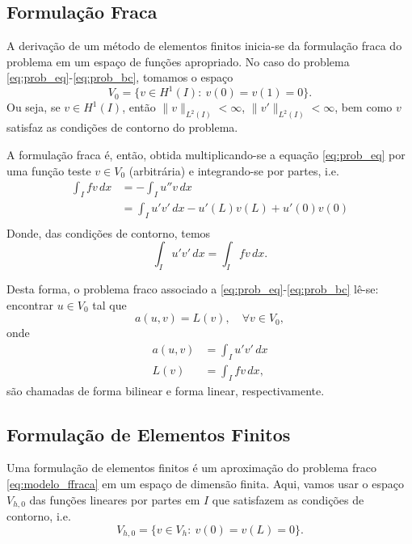 \subsection{Formulação Fraca}

A derivação de um método de elementos finitos inicia-se da formulação fraca do problema em um espaço de funções apropriado. No caso do problema \eqref{eq:prob_eq}-\eqref{eq:prob_bc}, tomamos o espaço
\begin{equation}
  V_0 = \{v\in H^1(I):~v(0)=v(1)=0\}.
\end{equation}
Ou seja, se $v\in H^1(I)$, então $\|v\|_{L^2(I)}<\infty$, $\|v'\|_{L^2(I)}<\infty$, bem como $v$ satisfaz as condições de contorno do problema.

A formulação fraca é, então, obtida multiplicando-se a equação \eqref{eq:prob_eq} por uma função teste $v\in V_0$ (arbitrária) e integrando-se por partes, i.e.
\begin{align}
  \int_I fv\,dx &= -\int_I u''v\,dx\\
  &= \int_I u'v'\,dx - u'(L)v(L) + u'(0)v(0)\\
\end{align}
Donde, das condições de contorno, temos
\begin{equation}
  \int_I u'v'\,dx = \int_I fv\,dx.
\end{equation}

Desta forma, o problema fraco associado a \eqref{eq:prob_eq}-\eqref{eq:prob_bc} lê-se: encontrar $u\in V_0$ tal que
\begin{equation}\label{eq:modelo_ffraca}
  a(u,v) = L(v),\quad\forall v\in V_0,
\end{equation}
onde
\begin{align}
  a(u,v) &= \int_I u'v'\,dx\label{eq:modelo_fbilinear}\\
  L(v) &= \int_I fv\,dx,\label{eq:modelo_flinear}
\end{align}
são chamadas de forma bilinear e forma linear, respectivamente.

\subsection{Formulação de Elementos Finitos}

Uma formulação de elementos finitos é um aproximação do problema fraco \eqref{eq:modelo_ffraca} em um espaço de dimensão finita. Aqui, vamos usar o espaço $V_{h,0}$ das funções lineares por partes em $I$ que satisfazem as condições de contorno, i.e.
\begin{equation}
  V_{h,0} = \{v\in V_h:~v(0)=v(L)=0\}.
\end{equation}

